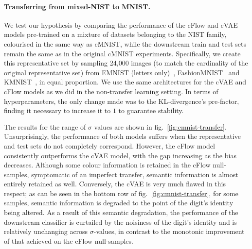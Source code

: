 \paragraph{Transferring from mixed-NIST to MNIST.}
We test our hypothesis by comparing the performance of the cFlow and cVAE models pre-trained on a mixture of datasets belonging to the NIST family, colourised in the same way as cMNIST, while the downstream train and test sets remain the same as in the original cMNIST experiments. Specifically, we create this representative set by sampling 24,000 images (to match the cardinality of the original representative set) from EMNIST (letters only)~\citep{cohen2017emnist}, Fashion\-MNIST~\citep{xiao2017fashion} and KMNIST~\citep{clanuwat2018deep}, in equal proportion. We use the same architectures for the cVAE and cFlow models as we did in the non-transfer learning setting. In terms of hyperparameters, the only change made was to the KL-divergence's pre-factor, finding it necessary to increase it to $1$ to guarantee stability.

The results for the range of $\sigma$ values are shown in fig.~\ref{fig:cmnist-transfer}. Unsurprisingly, the performance of both models suffers when the representative and test sets do not completely correspond. However, the cFlow model consistently outperforms the cVAE model, with the gap increasing as the bias decreases.
Although some colour information is retained in the cFlow null-samples, symptomatic of an imperfect transfer, semantic information is almost entirely retained as well.
Conversely, the cVAE is very much flawed in this respect; as can be seen in the bottom row of fig.~\ref{fig:cmnist-transfer}, for some samples, semantic information is degraded to the point of the digit's identity being altered. As a result of this semantic degradation, the performance of the downstream classifier is curtailed by the noisiness of the digit's identity and is relatively unchanging across $\sigma$-values, in contrast to the monotonic improvement of that achieved on the cFlow null-samples.


% 
% 


% 
